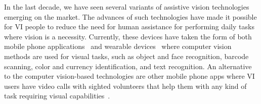 In the last decade, we have seen several variants of assistive vision technologies emerging on the market. The advances of such technologies have made it possible for VI people to reduce the need for human assistance for performing daily tasks where vision is a necessity. Currently, these devices have taken the form of both mobile phone applications~\cite{microsoft2017seeing, clary2018lookout,cloudsight2013taptapsee, envision2018app} and wearable devices~\cite{orcam2019myeye, envision2020glasses,caraiman2017soundofvision} where computer vision methods are used for visual tasks, such as object and face recognition, barcode scanning, color and currency identification, and text recognition. An alternative to the computer vision-based technologies are other mobile phone apps where VI users have video calls with sighted volunteers that help them with any kind of task requiring visual capabilities~\cite{bemyeyes2017be, aira2017aira}.  



